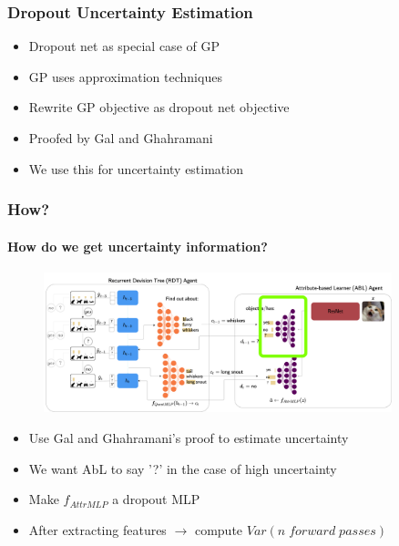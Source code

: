 \documentclass[9pt]{beamer}
\begin{document}
\begin{frame}
\frametitle{Dropout Uncertainty Estimation \cite{gal2016dropout}}
\begin{itemize}
	\item Dropout net as special case of GP
	\item GP uses approximation techniques
	\item Rewrite GP objective as dropout net objective
	\item Proofed by Gal and Ghahramani \cite{gal2016dropout} 
	\item We use this for uncertainty estimation
\end{itemize}
\end{frame}


\begin{frame}
\frametitle{How?}
\framesubtitle{How do we get uncertainty information?}\begin{figure}
	\centering
	\includegraphics[width=0.9\textwidth]{images/where_is_uncertainty.pdf} 
\end{figure}
\begin{itemize}
	\item Use Gal and Ghahramani's \cite{gal2016dropout} proof to estimate uncertainty 
	\item We want AbL to say '?' in the case of high uncertainty
	\item Make $f_{AttrMLP}$ a dropout MLP
	\item After extracting features $\rightarrow$ compute $Var(n \;forward\;passes)$
\end{itemize}
\end{frame}
\end{document}

